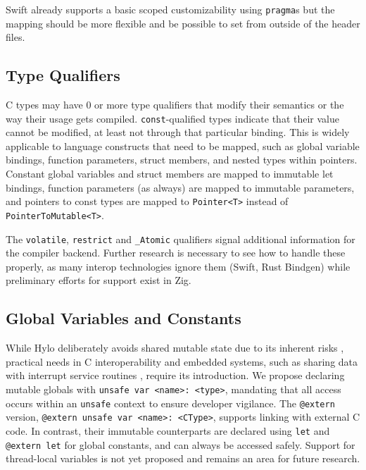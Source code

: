 Swift already supports a basic scoped customizability using \texttt{pragma}s but the mapping should be more flexible and be possible to set from outside of the header files.

\subsection{Type Qualifiers}
C types may have 0 or more type qualifiers that modify their semantics or the way their usage gets compiled. \texttt{const}-qualified types indicate that their value cannot be modified, at least not through that particular binding. This is widely applicable to language constructs that need to be mapped, such as global variable bindings, function parameters, struct members, and nested types within pointers. Constant global variables and struct members are mapped to immutable let bindings, function parameters (as always) are mapped to immutable parameters, and pointers to const types are mapped to \texttt{Pointer<T>} instead of \texttt{PointerToMutable<T>}.

The \texttt{volatile}, \texttt{restrict} and \texttt{\_Atomic} qualifiers signal additional information for the compiler backend. Further research is necessary to see how to handle these properly, as many interop technologies ignore them (Swift, Rust Bindgen) while preliminary efforts for support exist in Zig\cite{zig-qualifiers}.

\subsection{Global Variables and Constants}
While Hylo deliberately avoids shared mutable state due to its inherent risks \cite{sharedmut}\cite{shared-mutable-state}, practical needs in C interoperability and embedded systems, such as sharing data with interrupt service routines \cite{rust-embedded-pain}, require its introduction. We propose declaring mutable globals with \texttt{unsafe var <name>: <type>}, mandating that all access occurs within an \texttt{unsafe} context to ensure developer vigilance. The \texttt{@extern} version, \texttt{@extern unsafe var <name>: <CType>}, supports linking with external C code. In contrast, their immutable counterparts are declared using \texttt{let} and \texttt{@extern let} for global constants, and can always be accessed safely. Support for thread-local variables is not yet proposed and remains an area for future research.

